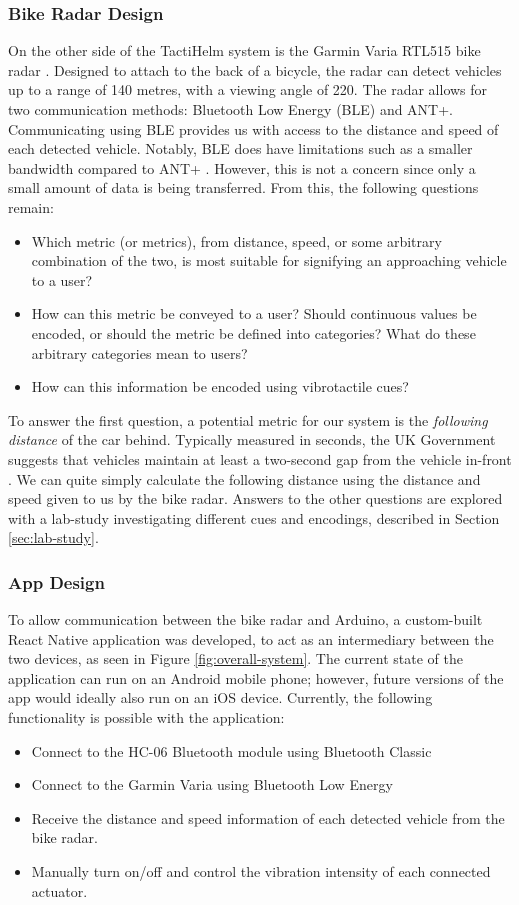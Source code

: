 \documentclass{interim}
\begin{document}
\subsubsection{Bike Radar Design}
On the other side of the TactiHelm system is the Garmin Varia RTL515 bike radar \cite{garminradar}. Designed to attach to the back of a bicycle, the radar can detect vehicles up to a range of 140 metres, with a viewing angle of 220\degree{}. The radar allows for two communication methods: Bluetooth Low Energy (BLE) and ANT+. Communicating using BLE provides us with access to the distance and speed of each detected vehicle. Notably, BLE does have limitations such as a smaller bandwidth compared to ANT+ \cite{bluetoothlimitations}. However, this is not a concern since only a small amount of data is being transferred. From this, the following questions remain:
\begin{itemize}
    \item Which metric (or metrics), from distance, speed, or some arbitrary combination of the two, is most suitable for signifying an approaching vehicle to a user?
    \item How can this metric be conveyed to a user? Should continuous values be encoded, or should the metric be defined into categories? What do these arbitrary categories mean to users? 
    \item How can this information be encoded using vibrotactile cues?
\end{itemize}

To answer the first question, a potential metric for our system is the \textit{following distance} of the car behind. Typically measured in seconds, the UK Government suggests that vehicles maintain at least a two-second gap from the vehicle in-front \cite{followdistance}. We can quite simply calculate the following distance using the distance and speed given to us by the bike radar. Answers to the other questions are explored with a lab-study investigating different cues and encodings, described in Section \ref{sec:lab-study}.


\subsubsection{App Design}
To allow communication between the bike radar and Arduino, a custom-built React Native application was developed, to act as an intermediary between the two devices, as seen in Figure \ref{fig:overall-system}. The current state of the application can run on an Android mobile phone; however, future versions of the app would ideally also run on an iOS device. Currently, the following functionality is possible with the application:
\begin{itemize}
    \item Connect to the HC-06 Bluetooth module using Bluetooth Classic
    \item Connect to the Garmin Varia using Bluetooth Low Energy
    \item Receive the distance and speed information of each detected vehicle from the bike radar.
    \item Manually turn on/off and control the vibration intensity of each connected actuator.
\end{itemize}
\end{document}
